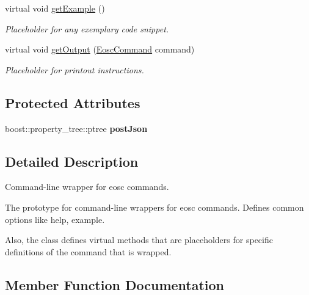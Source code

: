 \begin{DoxyCompactItemize}
virtual void \hyperlink{classtokenika_1_1eosc_1_1_command_options_ab1fe134b6c2230257a5c07b021812986}{get\+Example} ()
\begin{DoxyCompactList}\small\item\em Placeholder for any exemplary code snippet. \end{DoxyCompactList}\item 
virtual void \hyperlink{classtokenika_1_1eosc_1_1_command_options_a346dcfb00b8ac522169714544bfa7be0}{get\+Output} (\hyperlink{classtokenika_1_1eosc_1_1_eosc_command}{Eosc\+Command} command)
\begin{DoxyCompactList}\small\item\em Placeholder for printout instructions. \end{DoxyCompactList}\end{DoxyCompactItemize}
\subsection*{Protected Attributes}
\begin{DoxyCompactItemize}
\item 
\mbox{\label{classtokenika_1_1eosc_1_1_command_options_a626e842c89d8332090886bc53fbad616}} 
boost\+::property\+\_\+tree\+::ptree {\bfseries post\+Json}
\end{DoxyCompactItemize}


\subsection{Detailed Description}
Command-\/line wrapper for eosc commands. 

The prototype for command-\/line wrappers for eosc commands. Defines common options like \textquotesingle{}help\textquotesingle{}, \textquotesingle{}example\textquotesingle{}.

Also, the class defines virtual methods that are placeholders for specific definitions of the command that is wrapped. 

\subsection{Member Function Documentation}
\mbox{\label{classtokenika_1_1eosc_1_1_command_options_a28fb680d7477e19e523367d2585655fb}} 
